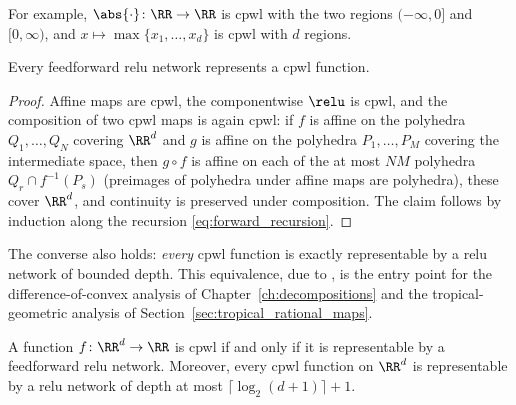 For example, $\abs{\cdot} \colon \RR \to \RR$ is \ac{cpwl} with the two regions $(-\infty, 0]$ and $[0, \infty)$, and $x \mapsto \max\{x_1, \ldots, x_d\}$ is \ac{cpwl} with $d$ regions.

\begin{observation}\label{obs:relu_is_cpwl}
Every feedforward \ac{relu} network represents a \ac{cpwl} function.
\hfill{}
\end{observation}

\begin{proof}
Affine maps are \ac{cpwl}, the componentwise $\relu$ is \ac{cpwl}, and the composition of two \ac{cpwl} maps is again \ac{cpwl}: if $f$ is affine on the polyhedra $Q_1, \ldots, Q_N$ covering $\RR^d$ and $g$ is affine on the polyhedra $P_1, \ldots, P_M$ covering the intermediate space, then $g \circ f$ is affine on each of the at most $NM$ polyhedra $Q_r \cap f^{-1}(P_s)$ (preimages of polyhedra under affine maps are polyhedra), these cover $\RR^d$, and continuity is preserved under composition. The claim follows by induction along the recursion \eqref{eq:forward_recursion}.
\end{proof}

The converse also holds: \emph{every} \ac{cpwl} function is exactly representable by a \ac{relu} network of bounded depth. This equivalence, due to \textcite{Arora2018}, is the entry point for the difference-of-convex analysis of Chapter~\ref{ch:decompositions} and the tropical-geometric analysis of Section~\ref{sec:tropical_rational_maps}.

\begin{theoremenv}\label{thm:cpwl_relu_equivalence}
A function $f \colon \RR^{d} \to \RR$ is \ac{cpwl} if and only if it is representable by a feedforward \ac{relu} network. Moreover, every \ac{cpwl} function on $\RR^d$ is representable by a \ac{relu} network of depth at most $\bigl\lceil \log_2(d+1) \bigr\rceil + 1$.
\end{theoremenv}

